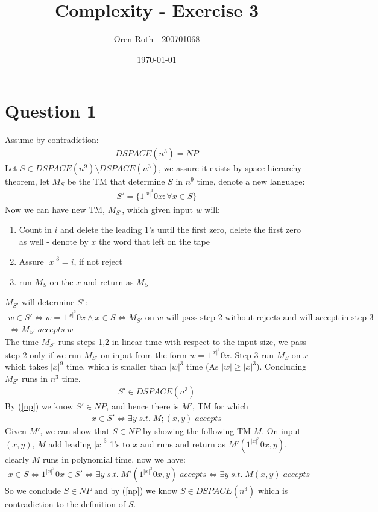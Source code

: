 \documentclass[11pt]{article}
\title{Complexity - Exercise 3}
\author{Oren Roth - 200701068}
\date{\today}
\theoremstyle{plain}
\theoremstyle{nonumberplainnobrackets}
\begin{document}
\maketitle
\section*{Question 1}
Assume by contradiction:
\begin{align}\label{np}
DSPACE(n^3) = NP
\end{align}
Let $S\in DSPACE(n^9) \setminus DSPACE(n^3)$, we assure it exists by space hierarchy theorem, let $M_S$ be the TM that determine $S$ in $n^9$ time, denote a new language:
\begin{align*}
S' = \{ 1^{|x|^3} 0x : \forall x\in S   \}
\end{align*}
Now we can have new TM, $M_{S'}$, which given input $w$ will:
\begin{enumerate}
	\item  Count in $i$ and delete the leading 1's until the first zero, delete the first zero as well - denote by $x$ the word that left on the tape
	\item  Assure $|x|^3 = i$, if not reject
	\item run $M_S$ on the $x$ and return as $M_S$
\end{enumerate}
$M_{S'}$ will determine $S'$:
\begin{align*}
w\in S' \iff  w =  1^{|x|^3} 0x \wedge  x\in S  \iff M_{S'} \text{ on }w \text{ will pass step 2 without rejects and will accept in step 3} \\ \iff M_{S'} \;accepts  \; w
\end{align*}
The time $M_{S'}$ runs steps 1,2 in linear time with respect to the input size, we pass step 2 only if we run $M_{S'}$ on input from the form $w=1^{|x|^3} 0x$. Step 3 run $M_S$ on $x$ which takes $|x|^9$ time, which is smaller than $|w|^3$ time (As $|w| \ge |x|^3$). Concluding $M_{S'}$ runs in $n^3$ time.
\begin{align*}
S' \in  DSPACE(n^3)
\end{align*}
By (\ref{np}) we know $S' \in NP$, and hence there is $M'$, TM for which 
\begin{align*}
x\in S' \iff \exists y\;s.t.\; M;(x,y) \;accepts
\end{align*}
Given $M'$, we can show that $S\in NP$ by showing the following TM $M$. On input $(x,y)$, $M$ add leading $|x|^3$ 1's to $x$ and runs and return as $M'(1^{|x|^3} 0x,y)$, clearly $M$ runs in polynomial time, now we have:
\begin{align*}
x\in S \iff 1^{|x|^3} 0x\in S' \iff \exists y\;s.t.\; M'(1^{|x|^3} 0x,y) \;accepts \iff  \exists y\;s.t.\; M(x,y) \;accepts
\end{align*}
So we conclude $S\in NP$ and by  (\ref{np}) we know $S \in  DSPACE(n^3)$ which is contradiction to the definition of $S$.
\end{document}

